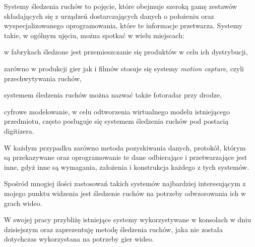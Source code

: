 \label{ch:wstep}

Systemy śledzenia ruchów to pojęcie, które obejmuje szeroką gamę zestawów składających się z urządzeń dostarczających danych o położeniu oraz wyspecjalizowanego oprogramowania, które te informacje przetwarza. Systemy takie, w ogólnym ujęciu, można spotkać w wielu miejscach:
\begin{aenumerate}
  \item w fabrykach śledzone jest przemieszczanie się produktów w celu ich dystrybucji,
  \item zarówno w produkcji gier jak i filmów stosuje się systemy \textsl{motion capture}, czyli przechwytywania ruchów,
  \item systemem śledzenia ruchów można nazwać także fotoradar przy drodze,
  \item cyfrowe modelowanie, w celu odtworzenia wirtualnego modelu istniejącego przedmiotu, często posługuje się systemem śledzenia ruchów pod postacią digitizera.
\end{aenumerate}

W każdym przypadku zarówno metoda pozyskiwania danych, protokół, którym są przekazywane oraz oprogramowanie te dane odbierające i przetwarzające jest inne, gdyż inne są wymagania, założenia i konstrukcja każdego z tych systemów.

Spośród mnogiej ilości zastosowań takich systemów najbardziej interesującym z mojego punktu widzenia jest śledzenie ruchów na potrzeby odwzorowania ich w grach wideo.

W swojej pracy przybliżę istniejące systemy wykorzystywane w konsolach w dniu dzisiejszym oraz zaprezentuję metodę śledzenia ruchów, jaka nie została dotychczas wykorzystana na potrzeby gier wideo.


